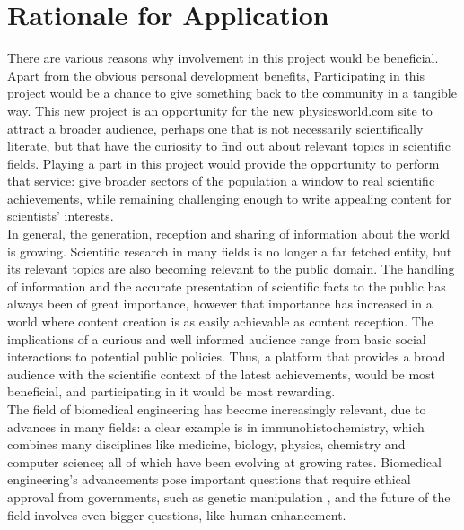 \section{Rationale for Application}
There are various reasons why involvement in this project would be beneficial. 
Apart from the obvious personal development benefits, 
Participating in this project would be a chance to give something back to 
the community in a tangible way. 
This new project is an opportunity for the new \url{physicsworld.com} 
site to attract a broader audience, perhaps one that is not
necessarily scientifically literate, but that have the curiosity to find out 
about relevant topics in scientific fields. Playing a part in this project would
provide the opportunity to perform that service: give broader sectors of the
population a window to real scientific achievements, while remaining challenging
enough to write appealing content for scientists' interests. 
\medskip\\In general, the generation, reception and sharing of information 
about the world is growing. Scientific research in many fields is no longer a 
far fetched entity, but its relevant topics are also becoming relevant to the 
public domain. The handling of information and the accurate presentation of
scientific facts to the public has always been of great importance, however
that importance has increased in a world where content creation is as easily 
achievable as content reception. The implications of a curious and well informed 
audience range from basic social interactions to potential public policies. 
Thus, a platform that provides a broad audience with the scientific context of 
the latest achievements, would be most beneficial, and participating in it would 
be most rewarding.\medskip\\ The field of biomedical engineering has become 
increasingly relevant, due to advances in many fields: a clear example is in
immunohistochemistry, which combines many disciplines like medicine, biology,
physics, chemistry and computer science; all of which have been evolving at 
growing rates. Biomedical engineering's advancements pose important questions 
that require ethical approval from governments, such as genetic manipulation
, 
and the future of the field involves even bigger questions, like human 
enhancement. 